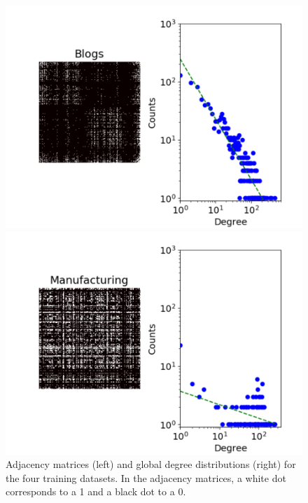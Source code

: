 \begin{figure}[h]
\begin{minipage}{0.4\textwidth}
            \includegraphics[width=\textwidth]{img/corpus/blogs_dd}
        \end{minipage}
        \begin{minipage}{0.4\textwidth}
            \includegraphics[width=\textwidth]{img/corpus/manufacturing_dd}
        \end{minipage}
	\caption{Adjacency matrices (left) and global degree distributions (right) for the four training datasets. In the adjacency matrices, a white dot corresponds to a 1 and a black dot to a 0.}
	\label{fig:corpuses}
\end{figure}


